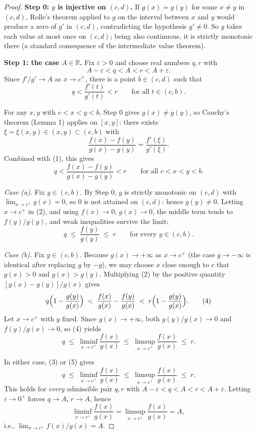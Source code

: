 \documentclass{essay}
\begin{document}
\begin{proof}
  \textbf{Step 0: $g$ is injective on $(c,d)$.} If $g(x)=g(y)$ for some $x\neq y$ in $(c,d)$, Rolle's theorem applied to $g$ on the interval between $x$ and $y$ would produce a zero of $g'$ in $(c,d)$, contradicting the hypothesis $g'\neq 0$. So $g$ takes each value at most once on $(c,d)$; being also continuous, it is strictly monotonic there (a standard consequence of the intermediate value theorem).

  \medskip
  \textbf{Step 1: the case $A\in\mathbb{R}$.} Fix $\varepsilon>0$ and choose real numbers $q,r$ with
  \[
    A-\varepsilon < q < A < r < A+\varepsilon.
  \]
  Since $f'/g'\to A$ as $x\to c^+$, there is a point $b\in(c,d)$ such that
  \[
    q < \frac{f'(t)}{g'(t)} < r \qquad \text{for all } t\in(c,b). \tag{1}
  \]

  For any $x,y$ with $c<x<y<b$, Step 0 gives $g(x)\neq g(y)$, so Cauchy's theorem (Lemma 1) applies on $[x,y]$: there exists $\xi=\xi(x,y)\in(x,y)\subset(c,b)$ with
  \[
    \frac{f(x)-f(y)}{g(x)-g(y)} = \frac{f'(\xi)}{g'(\xi)}.
  \]
  Combined with (1), this gives
  \[
    q < \frac{f(x)-f(y)}{g(x)-g(y)} < r \qquad \text{for all } c<x<y<b. \tag{2}
  \]

  \emph{Case (a).} Fix $y\in(c,b)$. By Step 0, $g$ is strictly monotonic on $(c,d)$ with $\lim_{x\to c^+}g(x)=0$, so $0$ is not attained on $(c,d)$: hence $g(y)\neq 0$. Letting $x\to c^+$ in (2), and using $f(x)\to 0$, $g(x)\to 0$, the middle term tends to $f(y)/g(y)$, and weak inequalities survive the limit:
  \[
    q \;\le\; \frac{f(y)}{g(y)} \;\le\; r \qquad \text{for every } y\in(c,b). \tag{3}
  \]

  \emph{Case (b).} Fix $y\in(c,b)$. Because $g(x)\to+\infty$ as $x\to c^+$ (the case $g\to-\infty$ is identical after replacing $g$ by $-g$), we may choose $x$ close enough to $c$ that $g(x)>0$ and $g(x)>g(y)$. Multiplying (2) by the positive quantity $[g(x)-g(y)]/g(x)$ gives
  \[
    q\Bigl(1-\frac{g(y)}{g(x)}\Bigr) \;<\; \frac{f(x)}{g(x)} - \frac{f(y)}{g(x)} \;<\; r\Bigl(1-\frac{g(y)}{g(x)}\Bigr). \tag{4}
  \]
  Let $x\to c^+$ with $y$ fixed. Since $g(x)\to+\infty$, both $g(y)/g(x)\to 0$ and $f(y)/g(x)\to 0$, so (4) yields
  \[
    q \;\le\; \liminf_{x\to c^+}\frac{f(x)}{g(x)} \;\le\; \limsup_{x\to c^+}\frac{f(x)}{g(x)} \;\le\; r. \tag{5}
  \]

  In either case, (3) or (5) gives
  \[
    q \;\le\; \liminf_{x\to c^+}\frac{f(x)}{g(x)} \;\le\; \limsup_{x\to c^+}\frac{f(x)}{g(x)} \;\le\; r.
  \]
  This holds for \emph{every} admissible pair $q,r$ with $A-\varepsilon<q<A<r<A+\varepsilon$. Letting $\varepsilon\to 0^+$ forces $q\to A$, $r\to A$, hence
  \[
    \liminf_{x\to c^+}\frac{f(x)}{g(x)} = \limsup_{x\to c^+}\frac{f(x)}{g(x)} = A,
  \]
  i.e., $\displaystyle\lim_{x\to c^+} f(x)/g(x) = A$.


\end{proof}
\end{document}
